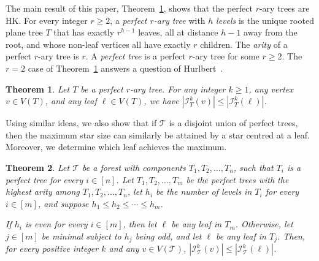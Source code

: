 \documentclass[11pt]{article}
\newtheorem{theorem}{Theorem}[section]
\theoremstyle{definition}
\newcommand{\cI}{\mathcal{I}}
\begin{document}


The main result of this paper, Theorem~\ref{thm:main}, shows that the perfect $r$-ary trees are HK. For every integer $r\geq2$, a \textit{perfect $r$-ary tree} with $h$ \textit{levels} is the unique rooted plane tree $T$ that has exactly $r^{h-1}$ leaves, all at distance $h-1$ away from the root, and whose non-leaf vertices all have exactly $r$ children. The \textit{arity} of a perfect $r$-ary tree is $r$. A \textit{perfect tree} is a perfect $r$-ary tree for some $r\geq2$. The $r=2$ case of Theorem~\ref{thm:main} answers a question of Hurlbert~\cite{H}. 

\begin{theorem}\label{thm:main}
Let $T$ be a perfect $r$-ary tree. For any integer $k \geq 1$, any vertex $v \in V(T)$, and any leaf $\ell \in V(T)$, we have $|\mathcal{I}_{T}^{k}(v)| \leq |\mathcal{I}_{T}^{k}(\ell)|$.
\end{theorem}

Using similar ideas, we also show that if $\mathcal{T}$ is a disjoint union of perfect trees, then the maximum star size can similarly be attained by a star centred at a leaf. Moreover, we determine which leaf achieves the maximum. 
\begin{theorem}\label{thm:forest}
Let $\mathcal{T}$ be a forest with components $T_1,T_2,\ldots,T_n$, such that $T_i$ is a perfect tree for every $i\in[n]$. Let $T_1,T_2,\ldots,T_m$ be the perfect trees with the highest arity among $T_1,T_2,\ldots,T_n$, let $h_i$ be the number of levels in $T_i$ for every $i\in[m]$, and suppose $h_1\leq h_2\leq\cdots\leq h_m$. 

If $h_i$ is even for every $i\in[m]$, then let $\ell$ be any leaf in $T_m$. Otherwise, let $j\in[m]$ be minimal subject to $h_j$ being odd, and let $\ell$ be any leaf in $T_j$. Then, for every positive integer $k$ and any $v\in V(\mathcal{T})$, $|\cI_{\mathcal{T}}^k(v)|\leq|\cI_{\mathcal{T}}^k(\ell)|$.
\end{theorem}
\end{document}
